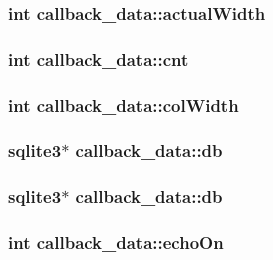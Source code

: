 \subsubsection{\setlength{\rightskip}{0pt plus 5cm}int \bf{callback\_\-data::actual\-Width}}\label{structcallback__data_3c8366e7e892d9bc454b07b402b0ef7f}


\subsubsection{\setlength{\rightskip}{0pt plus 5cm}int \bf{callback\_\-data::cnt}}\label{structcallback__data_e380e5b3e743b4d26e0432955510b24c}


\subsubsection{\setlength{\rightskip}{0pt plus 5cm}int \bf{callback\_\-data::col\-Width}}\label{structcallback__data_6b41e44100ffe997b4f325c647699e58}


\subsubsection{\setlength{\rightskip}{0pt plus 5cm}\bf{sqlite3}$\ast$ \bf{callback\_\-data::db}}\label{structcallback__data_cfea9677a52e79b7e42d808053fb7f00}


\subsubsection{\setlength{\rightskip}{0pt plus 5cm}\bf{sqlite3}$\ast$ \bf{callback\_\-data::db}}\label{structcallback__data_cfea9677a52e79b7e42d808053fb7f00}


\subsubsection{\setlength{\rightskip}{0pt plus 5cm}int \bf{callback\_\-data::echo\-On}}\label{structcallback__data_d1ca048e914b9c87553fa56e72dba1e6}


